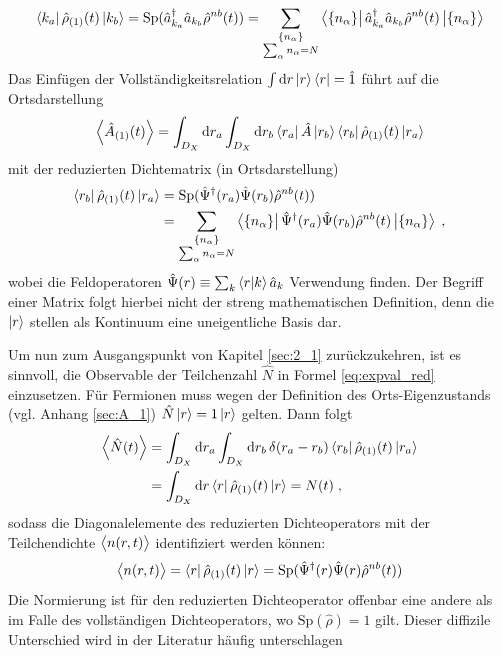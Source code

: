 \begin{equation*}
  \bra{k_a}{\hat{\rho}}_{(1)}(t)\ket{k_b} = \text{Sp} (\hat{a}^{\dagger}_{k_a}\hat{a}_{k_b} \hat{\rho}^{nb}(t))
  = \sum_{\substack{\{n_{\alpha}\} \\ \sum_{\alpha} n_{\alpha} = N}} \bra{\{n_{\alpha}\}} \hat{a}^{\dagger}_{k_a}\hat{a}_{k_b} \hat{\rho}^{nb}(t) \ket{\{n_{\alpha}\}}
\end{equation*}
Das Einfügen der Vollständigkeitsrelation $\int \mathop{}\!\mathrm{d} r \ket{r}\bra{r} = \hat{1}$ führt auf die Ortsdarstellung
\begin{equation}
  \expval{\hat{A}_{(1)}(t)} = \int_{D_X} \mathop{}\!\mathrm{d} r_a \int_{D_X} \mathop{}\!\mathrm{d} r_b \bra{r_a}\hat{A}\ket{r_b} \bra{r_b}\hat{\rho}_{(1)}(t) \ket{r_a}
  \label{eq:expval_red}
\end{equation}
mit der reduzierten Dichtematrix (in Ortsdarstellung)
\begin{equation}
\begin{aligned}
  \bra{r_b}\hat{\rho}_{(1)}(t) \ket{r_a} &= \text{Sp}(\hat{\Psi}^{\dagger}(r_a)\hat{\Psi}(r_b)\hat{\rho}^{nb}(t)) \\
   &= \sum_{\substack{\{n_{\alpha}\} \\ \sum_{\alpha} n_{\alpha} = N}} \bra{\{n_{\alpha}\}} \hat{\Psi}^{\dagger}(r_a)\hat{\Psi}(r_b)\hat{\rho}^{nb}(t) \ket{\{n_{\alpha}\}} \; ,
\end{aligned}
\label{eq:def_dichtematrix}
\end{equation}
wobei die Feldoperatoren $\hat{\Psi}(r) \equiv \sum_{k} \bra{r}\ket{k}\hat{a}_k$ Verwendung finden. Der Begriff einer Matrix folgt hierbei nicht der streng mathematischen Definition, denn die $\ket{r}$ stellen als Kontinuum eine uneigentliche Basis dar.

Um nun zum Ausgangspunkt von Kapitel \ref{sec:2_1} zurückzukehren, ist es sinnvoll, die Observable der Teilchenzahl $\hat{N}$  in Formel \eqref{eq:expval_red} einzusetzen. Für Fermionen muss wegen der Definition des Orts-Eigenzustands (vgl. Anhang \ref{sec:A_1}) $\hat{N}\ket{r}=1\ket{r}$ gelten. Dann folgt
\begin{align*}
  \expval{\hat{N}(t)} &= \int_{D_X} \mathop{}\!\mathrm{d} r_a \int_{D_X} \mathop{}\!\mathrm{d} r_b \, \delta(r_a-r_b) \bra{r_b}\hat{\rho}_{(1)}(t) \ket{r_a} \\
   &= \int_{D_X} \mathop{}\!\mathrm{d} r \bra{r}\hat{\rho}_{(1)}(t) \ket{r} = N(t) \; ,
\end{align*}
sodass die Diagonalelemente des reduzierten Dichteoperators mit der Teilchendichte $\expval{n(r,t)}$ identifiziert werden können:
\begin{equation}
  \expval{n(r,t)} = \bra{r}\hat{\rho}_{(1)}(t) \ket{r} = \text{Sp}(\hat{\Psi}^{\dagger}(r)\hat{\Psi}(r)\hat{\rho}^{nb}(t))
  \label{eq:expval_n}
\end{equation}
Die Normierung ist für den reduzierten Dichteoperator offenbar eine andere als im Falle des vollständigen Dichteoperators, wo $\text{Sp}(\hat{\rho})=1$ gilt. Dieser diffizile Unterschied wird in der Literatur häufig unterschlagen

